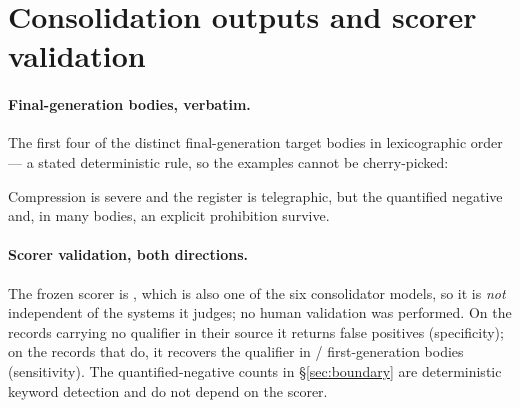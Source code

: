 \section{Consolidation outputs and scorer validation}\label{app:consolidation}

\paragraph{Final-generation bodies, verbatim.} The first four of the
\NineBodies{} distinct final-generation target bodies in lexicographic order
--- a stated deterministic rule, so the examples cannot be cherry-picked:

\begin{description}\small

\end{description}

Compression is severe and the register is telegraphic, but the quantified
negative and, in many bodies, an explicit prohibition survive.

\paragraph{Scorer validation, both directions.} The frozen scorer is
\texttt{\FiveScorerModel}, which is also one of the six consolidator models, so
it is \emph{not} independent of the systems it judges; no human validation was
performed. On the \FiveUnqualifiedMems{} records carrying no qualifier in their
source it returns \FiveFalsePosAll{} false positives (specificity); on the
\FiveQualifiedMems{} records that do, it recovers the qualifier in
\FiveScorerSensK/\FiveScorerSensN{} first-generation bodies (sensitivity). The
quantified-negative counts in \S\ref{sec:boundary} are deterministic keyword
detection and do not depend on the scorer.
